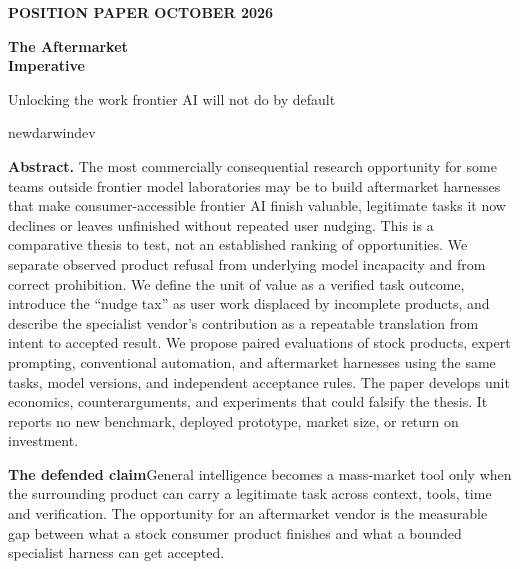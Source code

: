 \documentclass[12pt,letterpaper]{article}
\begin{document}
\thispagestyle{empty}
\vspace*{.5in}
{\sffamily\small\bfseries\color{teal} POSITION PAPER \hfill OCTOBER 2026}\par
\vspace{.55in}
{\fontsize{30}{35}\selectfont\bfseries The Aftermarket\\Imperative}\par
\vspace{.22in}
{\Large Unlocking the work frontier AI will not do by default}\par
\vspace{.42in}
{\large newdarwindev}\par
\vspace{.65in}
\begin{minipage}{.91\linewidth}
\textbf{Abstract.} The most commercially consequential research opportunity for some teams outside frontier model laboratories may be to build aftermarket harnesses that make consumer-accessible frontier AI finish valuable, legitimate tasks it now declines or leaves unfinished without repeated user nudging. This is a comparative thesis to test, not an established ranking of opportunities. We separate observed product refusal from underlying model incapacity and from correct prohibition. We define the unit of value as a verified task outcome, introduce the ``nudge tax'' as user work displaced by incomplete products, and describe the specialist vendor's contribution as a repeatable translation from intent to accepted result. We propose paired evaluations of stock products, expert prompting, conventional automation, and aftermarket harnesses using the same tasks, model versions, and independent acceptance rules. The paper develops unit economics, counterarguments, and experiments that could falsify the thesis. It reports no new benchmark, deployed prototype, market size, or return on investment.
\end{minipage}
\vfill
\begin{positionbox}
\textbf{The defended claim}\quad General intelligence becomes a mass-market tool only when the surrounding product can carry a legitimate task across context, tools, time and verification. The opportunity for an aftermarket vendor is the measurable gap between what a stock consumer product finishes and what a bounded specialist harness can get accepted.
\end{positionbox}
\clearpage









\small
\setlength{\bibsep}{.12em}


\end{document}
